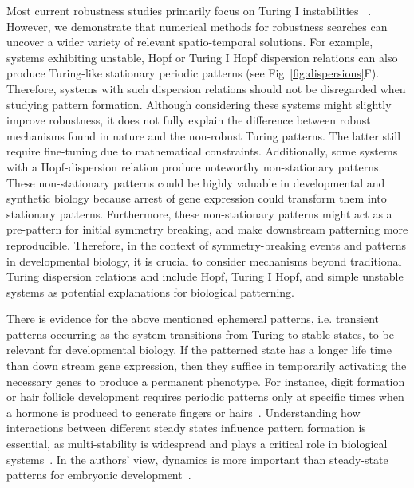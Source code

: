 \documentclass[10pt,letterpaper]{article}
\begin{document}
Most current robustness studies primarily focus on Turing I instabilities ~\parencite{Scholes2019, Zheng2016, Marcon}.
However, we demonstrate that numerical methods for robustness searches can uncover a wider variety of relevant spatio-temporal solutions.
For example, systems exhibiting unstable, Hopf or Turing I Hopf dispersion relations can also produce Turing-like stationary periodic patterns (see Fig~\ref{fig:dispersions}F). Therefore, systems with such dispersion relations should not be disregarded when studying pattern formation.
Although considering these systems might slightly improve robustness, it does not fully explain the difference between robust mechanisms found in nature and the non-robust Turing patterns. The latter still require fine-tuning due to mathematical constraints.
Additionally, some systems with a Hopf-dispersion relation produce noteworthy non-stationary patterns.
These non-stationary patterns could be highly valuable in developmental and synthetic biology because arrest of gene expression could transform them into stationary patterns.
Furthermore, these non-stationary patterns might act as a pre-pattern for initial symmetry breaking, and make downstream patterning more reproducible. 
Therefore, in the context of symmetry-breaking events and patterns in developmental biology, it is crucial to consider mechanisms beyond traditional Turing dispersion relations and include Hopf, Turing I Hopf, and simple unstable systems as potential explanations for biological patterning.


There is evidence for the above mentioned ephemeral patterns, i.e. transient patterns occurring as the system transitions from Turing to stable states, to be relevant for developmental biology. If the patterned state has a longer life time than down stream gene expression, then they suffice in temporarily activating the necessary genes to produce a permanent phenotype.
For instance, digit formation or hair follicle development requires periodic patterns only at specific times when a hormone is produced to generate fingers or hairs~\parencite{raspopovic2014digit,glover2023developmental}. 
Understanding how interactions between different steady states influence pattern formation is essential, as multi-stability is widespread and plays a critical role in biological systems~\parencite{laurent1999multistability}. In the authors' view, dynamics is more important than steady-state patterns for embryonic development~\parencite{pezzotta2023optimal}.
\end{document}
